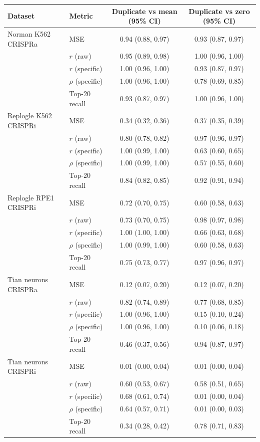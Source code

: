 \begin{tabular}{llcc}
\toprule
Dataset & Metric & Duplicate vs mean (95\% CI) & Duplicate vs zero (95\% CI) \\
\midrule
Norman K562 CRISPRa & MSE & 0.94 (0.88, 0.97) & 0.93 (0.87, 0.97) \\
 & $r$ (raw) & 0.95 (0.89, 0.98) & 1.00 (0.96, 1.00) \\
 & $r$ (specific) & 1.00 (0.96, 1.00) & 0.93 (0.87, 0.97) \\
 & $\rho$ (specific) & 1.00 (0.96, 1.00) & 0.78 (0.69, 0.85) \\
 & Top-20 recall & 0.93 (0.87, 0.97) & 1.00 (0.96, 1.00) \\
Replogle K562 CRISPRi & MSE & 0.34 (0.32, 0.36) & 0.37 (0.35, 0.39) \\
 & $r$ (raw) & 0.80 (0.78, 0.82) & 0.97 (0.96, 0.97) \\
 & $r$ (specific) & 1.00 (0.99, 1.00) & 0.63 (0.60, 0.65) \\
 & $\rho$ (specific) & 1.00 (0.99, 1.00) & 0.57 (0.55, 0.60) \\
 & Top-20 recall & 0.84 (0.82, 0.85) & 0.92 (0.91, 0.94) \\
Replogle RPE1 CRISPRi & MSE & 0.72 (0.70, 0.75) & 0.60 (0.58, 0.63) \\
 & $r$ (raw) & 0.73 (0.70, 0.75) & 0.98 (0.97, 0.98) \\
 & $r$ (specific) & 1.00 (1.00, 1.00) & 0.66 (0.63, 0.68) \\
 & $\rho$ (specific) & 1.00 (0.99, 1.00) & 0.60 (0.58, 0.63) \\
 & Top-20 recall & 0.75 (0.73, 0.77) & 0.97 (0.96, 0.97) \\
Tian neurons CRISPRa & MSE & 0.12 (0.07, 0.20) & 0.12 (0.07, 0.20) \\
 & $r$ (raw) & 0.82 (0.74, 0.89) & 0.77 (0.68, 0.85) \\
 & $r$ (specific) & 1.00 (0.96, 1.00) & 0.15 (0.10, 0.24) \\
 & $\rho$ (specific) & 1.00 (0.96, 1.00) & 0.10 (0.06, 0.18) \\
 & Top-20 recall & 0.46 (0.37, 0.56) & 0.94 (0.87, 0.97) \\
Tian neurons CRISPRi & MSE & 0.01 (0.00, 0.04) & 0.01 (0.00, 0.04) \\
 & $r$ (raw) & 0.60 (0.53, 0.67) & 0.58 (0.51, 0.65) \\
 & $r$ (specific) & 0.68 (0.61, 0.74) & 0.01 (0.00, 0.04) \\
 & $\rho$ (specific) & 0.64 (0.57, 0.71) & 0.01 (0.00, 0.03) \\
 & Top-20 recall & 0.34 (0.28, 0.42) & 0.78 (0.71, 0.83) \\
\bottomrule
\end{tabular}